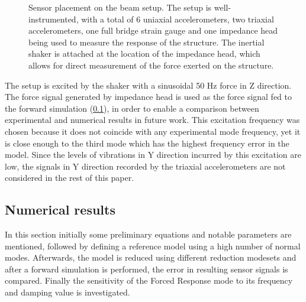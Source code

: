 \begin{figure}
{
    }
    \caption[Sensor placement on the beam setup]{Sensor placement on the beam setup. The setup is well-instrumented, with a total of 6 uniaxial accelerometers, two triaxial accelerometers, one full bridge strain gauge and one impedance head being used to measure the response of the structure. The inertial shaker is attached at the location of the impedance head, which allows for direct measurement of the force exerted on the structure.}
    \label{fig:S3_sensorSchematic}
\end{figure}

The setup is excited by the shaker with a sinusoidal 50 Hz force in Z direction. The force signal generated by impedance head is used as the force signal fed to the forward simulation (\cref{sec:S3_NumericalResults}), in order to enable a comparison between experimental and numerical results in future work. This excitation frequency was chosen because it does not coincide with any experimental mode frequency, yet it is close enough to the third mode which has the highest frequency error in the model. Since the levels of vibrations in Y direction incurred by this excitation are low, the signals in Y direction recorded by the triaxial accelerometers are not considered in the rest of this paper.

\subsection{Numerical results}
\label{sec:S3_NumericalResults}

In this section initially some preliminary equations and notable parameters are mentioned, followed by defining a reference model using a high number of normal modes. Afterwards, the model is reduced using different reduction modesets and after a forward simulation is performed, the error in resulting sensor signals is compared. Finally the sensitivity of the Forced Response mode to its frequency and damping value is investigated.

